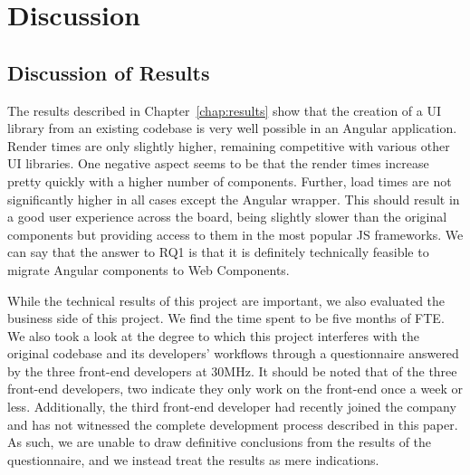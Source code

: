 \chapter{Discussion}\label{chap:discussion}

\section{Discussion of Results}
The results described in Chapter~\ref{chap:results} show that the creation of a UI library from an existing codebase is very well possible in an Angular application. Render times are only slightly higher, remaining competitive with various other UI libraries. One negative aspect seems to be that the render times increase pretty quickly with a higher number of components. Further, load times are not significantly higher in all cases except the Angular wrapper. This should result in a good user experience across the board, being slightly slower than the original components but providing access to them in the most popular JS frameworks. We can say that the answer to RQ1 is that it is definitely technically feasible to migrate Angular components to Web Components.

While the technical results of this project are important, we also evaluated the business side of this project. We find the time spent to be five months of FTE\@. We also took a look at the degree to which this project interferes with the original codebase and its developers' workflows through a questionnaire answered by the three front-end developers at 30MHz. It should be noted that of the three front-end developers, two indicate they only work on the front-end once a week or less. Additionally, the third front-end developer had recently joined the company and has not witnessed the complete development process described in this paper. As such, we are unable to draw definitive conclusions from the results of the questionnaire, and we instead treat the results as mere indications.

